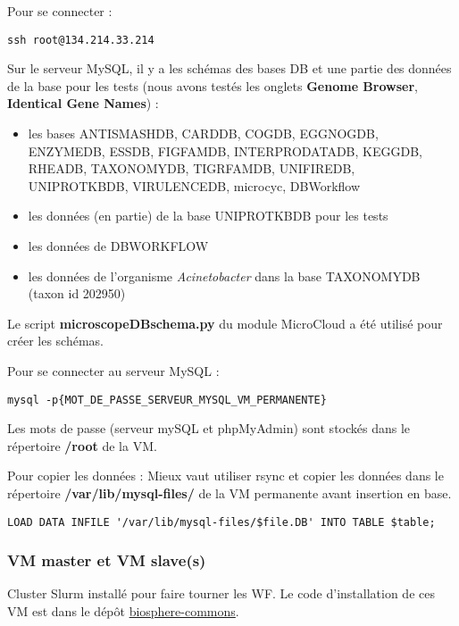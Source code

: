 Pour se connecter : 
\begin{lstlisting}[style=bash]
ssh root@134.214.33.214
\end{lstlisting}
\bigskip

Sur le serveur MySQL, il y a les schémas des bases DB et une partie des données de la base pour les tests (nous avons testés les onglets \textbf{Genome Browser}, \textbf{Identical Gene Names}) :
\begin{itemize}
	\item les bases ANTISMASHDB, CARDDB, COGDB, EGGNOGDB, ENZYMEDB, ESSDB, FIGFAMDB, INTERPRODATADB, KEGGDB, RHEADB, TAXONOMYDB, TIGRFAMDB, UNIFIREDB, UNIPROTKBDB, VIRULENCEDB, microcyc, DBWorkflow
	\item les données (en partie) de la base UNIPROTKBDB pour les tests
	\item les données de DBWORKFLOW
	\item les données de l'organisme \textit{Acinetobacter} dans la base TAXONOMYDB (taxon id 202950)
\end{itemize}

Le script \textbf{microscopeDBschema.py} du module MicroCloud a été utilisé pour créer les schémas.
\newline

Pour se connecter au serveur MySQL :
\begin{lstlisting}[style=bash]
mysql -p{MOT_DE_PASSE_SERVEUR_MYSQL_VM_PERMANENTE}
\end{lstlisting}
\bigskip

Les mots de passe (serveur mySQL et phpMyAdmin) sont stockés dans le répertoire \textbf{/root} de la VM.
\newline 

Pour copier les données :
Mieux vaut utiliser rsync et copier les données dans le répertoire \textbf{/var/lib/mysql-files/} de la VM permanente avant insertion en base.\\

\begin{lstlisting}[style=bash]
LOAD DATA INFILE '/var/lib/mysql-files/$file.DB' INTO TABLE $table;
\end{lstlisting}

\subsubsection{VM master et VM slave(s)}
Cluster Slurm installé pour faire tourner les WF. Le code d’installation de ces VM est dans le dépôt \href{https://github.com/IFB-ElixirFr/biosphere-commons}{biosphere-commons}.
\newline

